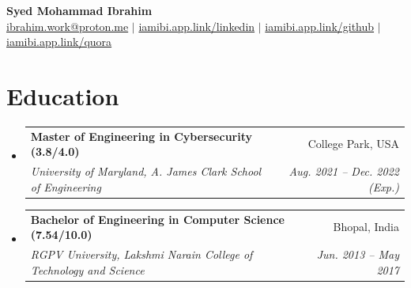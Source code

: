 \documentclass[letterpaper,11pt]{article}
\makeatletter
\newcommand{\resumeSubheading}[4]{
  \vspace{-2pt}\item
    \begin{tabular*}{0.97\textwidth}[t]{l@{\extracolsep{\fill}}r}
      \textbf{#1} & #2 \\
      \textit{\small#3} & \textit{\small #4} \\
    \end{tabular*}\vspace{-7pt}
}
\newcommand{\resumeSubHeadingListStart}{\begin{itemize}[leftmargin=0.15in, label={}]}
\newcommand{\resumeSubHeadingListEnd}{\end{itemize}}
\makeatother
\begin{document}

\begin{center}
    \textbf{\Huge{Syed Mohammad Ibrahim}} \\ \vspace{1pt}
    \href{mailto:ibrahim.work@proton.me}{ibrahim.work@proton.me} $|$
    \href{https://iamibi.app.link/linkedin}{iamibi.app.link/linkedin} $|$
    \href{https://iamibi.app.link/github}{iamibi.app.link/github} $|$
    \href{https://iamibi.app.link/quora}{iamibi.app.link/quora}
\end{center}

\section{Education}
  \resumeSubHeadingListStart
    \resumeSubheading
      {Master of Engineering in Cybersecurity (3.8/4.0)}{College Park, USA}
      {University of Maryland, A. James Clark School of Engineering}{Aug. 2021 -- Dec. 2022 (Exp.)}
    \resumeSubheading
      {Bachelor of Engineering in Computer Science (7.54/10.0)}{Bhopal, India}
      {RGPV University, Lakshmi Narain College of Technology and Science}{Jun. 2013 -- May 2017}
  \resumeSubHeadingListEnd
\end{document}
